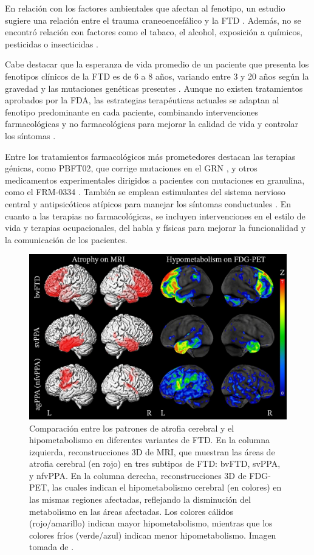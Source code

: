 En relación con los factores ambientales que afectan al fenotipo, un estudio sugiere una relación entre el trauma craneoencefálico y la FTD \cite{granadillo2008genetica, rosso2003medical}. Además, no se encontró relación con factores como el tabaco, el alcohol, exposición a químicos, pesticidas o insecticidas \cite{rosso2003medical}. 


Cabe destacar que la esperanza de vida promedio de un paciente que presenta los fenotipos clínicos de la FTD es de 6 a 8 años, variando entre 3 y 20 años según la gravedad y las mutaciones genéticas presentes \cite{Hodges2003}. Aunque no existen tratamientos aprobados por la FDA, las estrategias terapéuticas actuales se adaptan al fenotipo predominante en cada paciente, combinando intervenciones farmacológicas y no farmacológicas para mejorar la calidad de vida y controlar los síntomas \cite{SpringerLink2023}.

Entre los tratamientos farmacológicos más prometedores destacan las terapias génicas, como PBFT02, que corrige mutaciones en el GRN \cite{PassageBio2023}, y otros medicamentos experimentales dirigidos a pacientes con mutaciones en granulina, como el FRM-0334 \cite{MayoClinic2023}. También se emplean estimulantes del sistema nervioso central y antipsicóticos atípicos para manejar los síntomas conductuales \cite{NINDS2023}. En cuanto a las terapias no farmacológicas, se incluyen intervenciones en el estilo de vida y terapias ocupacionales, del habla y físicas para mejorar la funcionalidad y la comunicación de los pacientes.


\begin{figure}[h]
	\centering
	\includegraphics[width=0.75\linewidth]{figures/introduction/differences.jpg}
	\caption{Comparación entre los patrones de atrofia cerebral y el hipometabolismo en diferentes variantes de FTD. En la columna izquierda, reconstrucciones 3D de MRI, que muestran las áreas de atrofia cerebral (en rojo) en tres subtipos de FTD: bvFTD, svPPA, y nfvPPA. En la columna derecha, reconstrucciones 3D de FDG-PET, las cuales indican el hipometabolismo cerebral (en colores) en las mismas regiones afectadas, reflejando la disminución del metabolismo en las áreas afectadas. Los colores cálidos (rojo/amarillo) indican mayor hipometabolismo, mientras que los colores fríos (verde/azul) indican menor hipometabolismo. Imagen tomada de \cite{peet2021neuroimaging}.}
	\label{fig:comparacion_imagenes_diagnostico}
\end{figure}

